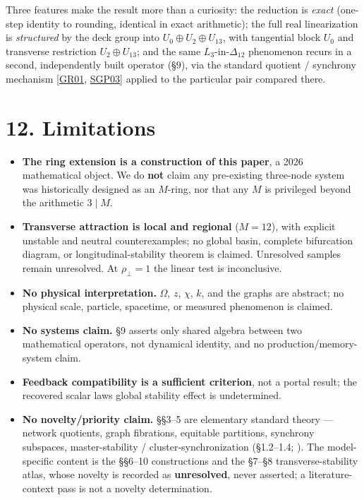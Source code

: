 \documentclass[
  11pt,
  a4paper,
]{article}
\providecommand{\tightlist}{%
  \setlength{\itemsep}{0pt}\setlength{\parskip}{0pt}}
\begin{document}
Three features make the result more than a curiosity: the reduction is \emph{exact} (one-step identity to rounding, identical in exact arithmetic); the full real linearization is \emph{structured} by the deck group into \(U_0\oplus U_2\oplus U_{13}\), with tangential block \(U_0\) and transverse restriction \(U_2\oplus U_{13}\); and the same \(L_3\)-in-\(\Delta_{12}\) phenomenon recurs in a second, independently built operator (§9), via the standard quotient / synchrony mechanism {[}\hyperlink{ref-GR01}{GR01}, \hyperlink{ref-SGP03}{SGP03}{]} applied to the particular pair compared there.

\section{12. Limitations}\label{limitations}

\begin{itemize}
\tightlist
\item
  \textbf{The ring extension is a construction of this paper}, a 2026 mathematical object. We do \textbf{not} claim any pre-existing three-node system was historically designed as an \(M\)-ring, nor that any \(M\) is privileged beyond the arithmetic \(3\mid M\).
\item
  \textbf{Transverse attraction is local and regional} (\(M=12\)), with explicit unstable and neutral counterexamples; no global basin, complete bifurcation diagram, or longitudinal-stability theorem is claimed. Unresolved samples remain unresolved. At \(\rho_\perp=1\) the linear test is inconclusive.
\item
  \textbf{No physical interpretation.} \(\Omega\), \(z\), \(\chi\), \(k\), and the graphs are abstract; no physical scale, particle, spacetime, or measured phenomenon is claimed.
\item
  \textbf{No systems claim.} §9 asserts only shared algebra between two mathematical operators, not dynamical identity, and no production/memory-system claim.
\item
  \textbf{Feedback compatibility is a sufficient criterion}, not a portal result; the recovered scalar law\textquotesingle s global stability effect is undetermined.
\item
  \textbf{No novelty/priority claim.} §§3--5 are elementary standard theory --- network quotients, graph fibrations, equitable partitions, synchrony subspaces, master-stability / cluster-synchronization (§1.2--1.4; ). The model-specific content is the §§6--10 constructions and the §7--§8 transverse-stability atlas, whose novelty is recorded as \textbf{unresolved}, never asserted; a literature-context pass is not a novelty determination.
\end{itemize}
\end{document}
